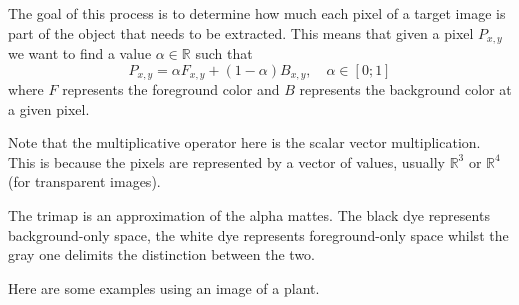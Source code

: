 \documentclass[a4paper]{article}
\begin{document}
The goal of this process is to determine
how much each pixel of a target image is part of the
object that needs to be extracted.
This means that given a pixel \(P_{x,y}\)
we want to find a value \(\alpha \in \mathbb{R}\) such that
\[
    P_{x,y} = \alpha F_{x,y} + (1-\alpha) B_{x,y},
    \quad \alpha \in [0;1]
\]
where \(F\) represents the foreground color
and \(B\) represents the background color at a given pixel.

Note that the multiplicative operator here is the scalar vector multiplication.
This is because the pixels are represented by a vector of values,
usually \({\mathbb{R}}^3\) or \({\mathbb{R}}^4\) (for transparent images).

The \gls{trimap} is an approximation of the alpha mattes.
The black dye represents background-only space, the white dye
represents foreground-only space whilst the gray one
delimits the distinction between the two.

Here are some examples using an image of a plant.
\end{document}
